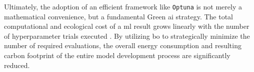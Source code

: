 Ultimately, the adoption of an efficient framework like \texttt{Optuna} is not merely a mathematical convenience, but a fundamental Green \gls{ai} strategy. The total computational and ecological cost of a \gls{ml} result grows linearly with the number of hyperparameter trials executed \parencite{schwartzGreenAI2020}. By utilizing \gls{bo} to strategically minimize the number of required evaluations, the overall energy consumption and resulting carbon footprint of the entire model development process are significantly reduced.
